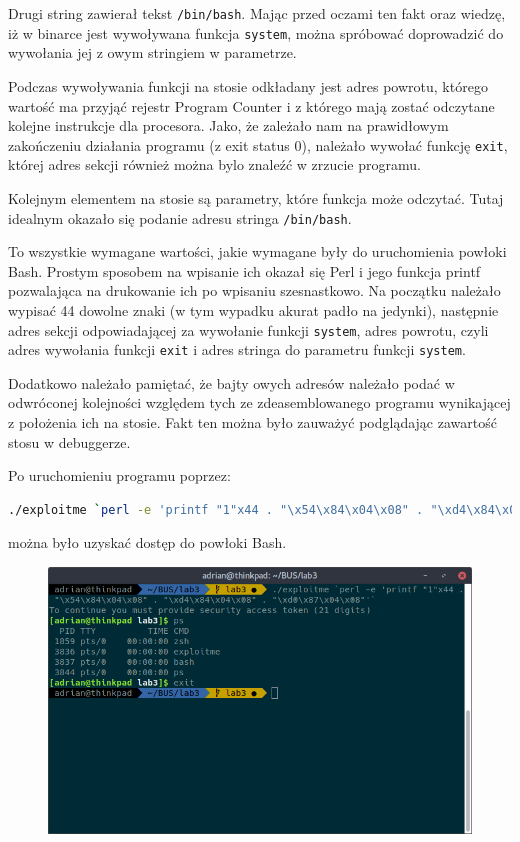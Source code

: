 \documentclass[a4paper]{article}
\begin{document}
Drugi string zawierał tekst \texttt{/bin/bash}. Mając przed oczami ten fakt oraz wiedzę, iż w binarce jest wywoływana funkcja \texttt{system}, można spróbować doprowadzić do wywołania jej z owym stringiem w parametrze.

Podczas wywoływania funkcji na stosie odkładany jest adres powrotu, którego wartość ma przyjąć rejestr Program Counter i z którego mają zostać odczytane kolejne instrukcje dla procesora. Jako, że zależało nam na prawidłowym zakończeniu działania programu (z exit status 0), należało wywołać funkcję \texttt{exit}, której adres sekcji również można bylo znaleźć w zrzucie programu.

Kolejnym elementem na stosie są parametry, które funkcja może odczytać. Tutaj idealnym okazało się podanie adresu stringa \texttt{/bin/bash}.

To wszystkie wymagane wartości, jakie wymagane były do uruchomienia powłoki Bash. Prostym sposobem na wpisanie ich okazał się Perl i jego funkcja printf pozwalająca na drukowanie ich po wpisaniu szesnastkowo. Na początku należało wypisać 44 dowolne znaki (w tym wypadku akurat padło na jedynki), następnie adres sekcji odpowiadającej za wywołanie funkcji \texttt{system}, adres powrotu, czyli adres wywołania funkcji \texttt{exit} i adres stringa do parametru funkcji \texttt{system}.

Dodatkowo należało pamiętać, że bajty owych adresów należało podać w odwróconej kolejności względem tych ze zdeasemblowanego programu wynikającej z położenia ich na stosie. Fakt ten można było zauważyć podglądając zawartość stosu w debuggerze.

Po uruchomieniu programu poprzez:
\begin{lstlisting}[language=bash]
./exploitme `perl -e 'printf "1"x44 . "\x54\x84\x04\x08" . "\xd4\x84\x04\x08" . "\xd0\x87\x04\x08"'`
\end{lstlisting}
można było uzyskać dostęp do powłoki Bash.

\begin{figure}[H]
	\center
	\includegraphics[width=.9\textwidth]{scr.png}
\end{figure}
\end{document}
